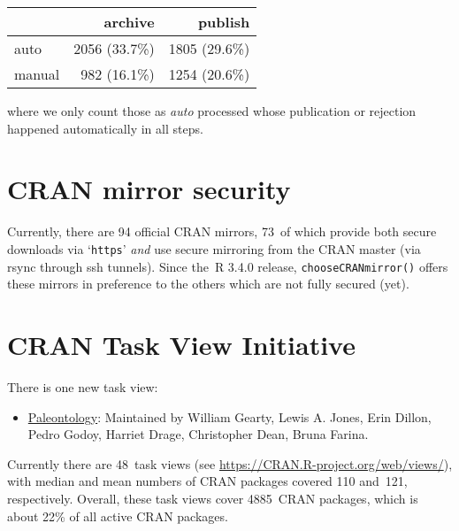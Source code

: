 \begin{longtable}[]{@{}lrr@{}}
\toprule\noalign{}
& archive & publish \\
\midrule\noalign{}
\endhead
\bottomrule\noalign{}
\endlastfoot
auto & 2056 (33.7\%) & 1805 (29.6\%) \\
manual & 982 (16.1\%) & 1254 (20.6\%) \\
\end{longtable}

\noindent where we only count those as \emph{auto} processed whose publication or
rejection happened automatically in all steps.

\hypertarget{cran-mirror-security}{%
\section{CRAN mirror security}\label{cran-mirror-security}}

Currently, there are 94 official CRAN mirrors,
73~of which provide both
secure downloads via `\texttt{https}' \emph{and} use secure mirroring from the CRAN master
(via rsync through ssh tunnels). Since the~R 3.4.0 release, \texttt{chooseCRANmirror()}
offers these mirrors in preference to the others which are not fully secured (yet).

\hypertarget{cran-task-view-initiative}{%
\section{CRAN Task View Initiative}\label{cran-task-view-initiative}}

There is one new task view:

\begin{itemize}
\tightlist
\item
  \href{https://CRAN.R-project.org/view=Paleontology}{Paleontology}: Maintained by William Gearty, Lewis A. Jones, Erin Dillon, Pedro Godoy, Harriet Drage, Christopher Dean, Bruna Farina.
\end{itemize}

Currently there are 48~task views (see \url{https://CRAN.R-project.org/web/views/}),
with median and mean numbers of CRAN packages covered
110 and~121, respectively.
Overall, these task views cover 4885~CRAN packages,
which is about 22\% of all active CRAN packages.


\address{%
Kurt Hornik\\
WU Wirtschaftsuniversität Wien\\%
Austria\\
%
%
\textit{ORCiD: \href{https://orcid.org/0000-0003-4198-9911}{0000-0003-4198-9911}}\\%
\href{mailto:Kurt.Hornik@R-project.org}{\nolinkurl{Kurt.Hornik@R-project.org}}%
}

